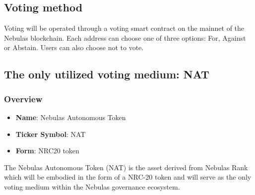 \subsection{Voting method}

Voting will be operated through a voting smart contract on the mainnet of the Nebulas blockchain. Each address can choose one of three options: For, Against or Abstain. Users can also choose not to vote.

\subsection{The only utilized voting medium: NAT}

\label{nat}

\subsubsection{Overview}

\begin{itemize}
	\item \textbf{Name}: Nebulas Autonomous Token
	\item \textbf{Ticker Symbol}: NAT
	\item \textbf{Form}: NRC20 token
\end{itemize}

The Nebulas Autonomous Token (NAT) is the asset derived from Nebulas Rank which will be embodied in the form of a NRC-20 token and will serve as the only voting medium within the Nebulas governance ecosystem.

